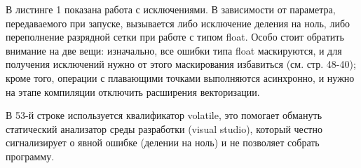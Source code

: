 \documentclass[a4paper,12pt]{article} %
\begin{document}
\setcounter{page}{2}
\newpage


В листинге 1 показана работа с исключениями. В зависимости от параметра, передаваемого при запуске, вызывается либо исключение деления на ноль, либо переполнение разрядной сетки при работе с типом float. Особо стоит обратить внимание на две вещи: изначально, все ошибки типа float маскируются, и для получения исключений нужно от этого маскирования избавиться (см. стр. 48-40); кроме того, операции с плавающими точками выполняются асинхронно, и нужно на этапе компиляции отключить расширения векторизации.

В 53-й строке используется квалификатор volatile, это помогает обмануть статический анализатор среды разработки (visual studio), который честно сигнализирует о явной ошибке (делении на ноль) и не позволяет собрать программу.
\end{document}
